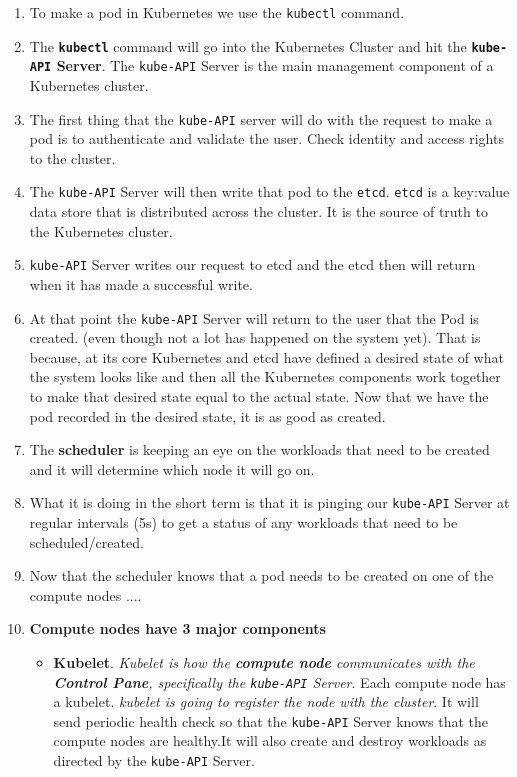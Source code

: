 \documentclass{article}
\begin{document}
\begin{enumerate}
    \item To make a pod in Kubernetes we use the \lstinline{kubectl} command. \item The \textbf{\lstinline{kubectl}} command will go into the Kubernetes Cluster and hit the \textbf{\lstinline{kube-API} Server}. The \lstinline{kube-API} Server is the main management component of a Kubernetes cluster. 
    \item  The first thing that the \lstinline{kube-API} server will do with the request to make a pod is to authenticate and validate the user. Check identity and access rights to the cluster. 
    \item  The \lstinline{kube-API} Server will then write that pod to the \lstinline{etcd}.  \lstinline{etcd} is a key:value data store that is distributed across the cluster. It is the source of truth to the Kubernetes cluster.
    \item \lstinline{kube-API} Server writes our request to etcd and the etcd then will return when it has made a successful write. 
    \item At that point the \lstinline{kube-API} Server will return to the user that the Pod is created. (even though not a lot has happened on the system yet). That is because, at its core Kubernetes and etcd have defined a desired state of what the system looks like and then all the Kubernetes components work together to make that desired state equal to the actual state. Now that we have the pod recorded in the desired state, it is as good as created. 
    \item The \textbf{scheduler} is keeping an eye on the workloads that need to be created and it will determine which node it will go on.
    \item What it is doing in the short term is that it is pinging our \lstinline{kube-API} Server at regular intervals (5s) to get a status of any workloads that need to be scheduled/created.
    \item Now that the scheduler knows that a pod needs to be created on one of the compute nodes .... 
    \item \textbf{Compute nodes have 3 major components}
    \begin{itemize}
        \item \textbf{Kubelet}. \textit{Kubelet is how the \textbf{compute node} communicates with the \textbf{Control Pane}, specifically the \lstinline{kube-API} Server}. Each compute node has a kubelet. \textit{kubelet is going to register the node with the cluster}. It will send periodic health check so that the \lstinline{kube-API} Server knows that the compute nodes are healthy.It will also create and destroy workloads as directed by the \lstinline{kube-API} Server. 

\end{itemize}
\end{enumerate}
\end{document}
